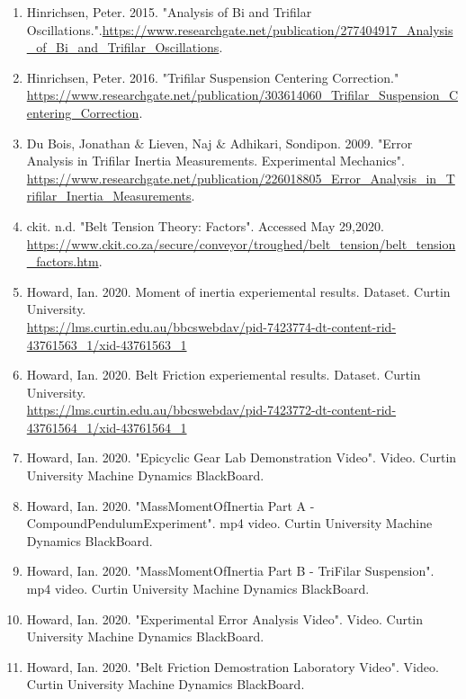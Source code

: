 \begin{enumerate}
\item Hinrichsen, Peter. 2015. "Analysis of Bi and Trifilar Oscillations.".\url{https://www.researchgate.net/publication/277404917_Analysis_of_Bi_and_Trifilar_Oscillations}.
\item Hinrichsen, Peter. 2016. "Trifilar Suspension Centering Correction." \url{https://www.researchgate.net/publication/303614060_Trifilar_Suspension_Centering_Correction}.
\item Du Bois, Jonathan $\&$ Lieven, Naj $\&$ Adhikari, Sondipon. 2009. "Error Analysis in Trifilar Inertia Measurements. Experimental Mechanics". \url{https://www.researchgate.net/publication/226018805_Error_Analysis_in_Trifilar_Inertia_Measurements}.
\item ckit. n.d. "Belt Tension Theory: Factors". Accessed May 29,2020. \url{https://www.ckit.co.za/secure/conveyor/troughed/belt_tension/belt_tension_factors.htm}.
\item Howard, Ian. 2020. Moment of inertia experiemental results. Dataset. Curtin University. \\ \url{https://lms.curtin.edu.au/bbcswebdav/pid-7423774-dt-content-rid-43761563_1/xid-43761563_1}
\item Howard, Ian. 2020. Belt Friction experiemental results. Dataset. Curtin University. \\ \url{https://lms.curtin.edu.au/bbcswebdav/pid-7423772-dt-content-rid-43761564_1/xid-43761564_1}
\item Howard, Ian. 2020. "Epicyclic Gear Lab Demonstration Video". Video. Curtin University Machine Dynamics BlackBoard.
\item Howard, Ian. 2020. "MassMomentOfInertia Part A - CompoundPendulumExperiment". mp4 video. Curtin University Machine Dynamics BlackBoard.
\item Howard, Ian. 2020. "MassMomentOfInertia Part B - TriFilar Suspension". mp4 video. Curtin University Machine Dynamics BlackBoard.
\item Howard, Ian. 2020. "Experimental Error Analysis Video". Video. Curtin University Machine Dynamics BlackBoard.
\item Howard, Ian. 2020. "Belt Friction Demostration Laboratory Video". Video. Curtin University Machine Dynamics BlackBoard.
\end{enumerate}
